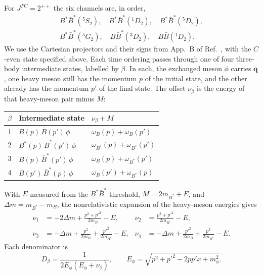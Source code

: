 For $J^{PC}=2^{++}$ the six channels are, in order,
\begin{equation}
\begin{gathered}
 B^*\bar B^*({}^5S_2),\quad B^*\bar B^*({}^1D_2),\quad
 B^*\bar B^*({}^5D_2),\\
 B^*\bar B^*({}^5G_2),\quad B\bar B^*({}^3D_2),\quad
 B\bar B({}^1D_2).
\end{gathered}
\label{eq:channels-2pp}
\end{equation}
We use the Cartesian projectors and their signs from App.~B of
Ref.~\cite{Baru:2019xnh}, with the $C$-even state specified above.
Each time ordering passes through one of four three-body intermediate
states, labelled by $\beta$. In each, the exchanged meson $\phi$ carries
$\bm q$, one heavy meson still has the momentum $p$ of the initial state,
and the other already has the momentum $p'$ of the final state. The
offset $\nu_\beta$ is the energy of that heavy-meson pair minus $M$:
\begin{center}
\begin{tabular}{c@{\qquad}l@{\qquad}l}
\toprule
$\beta$ & Intermediate state & $\nu_\beta+M$\\
\midrule
1 & $B(p)\,\bar B(p')\,\phi$ & $\omega_B(p)+\omega_B(p')$\\
2 & $B^*(p)\,\bar B^*(p')\,\phi$ & $\omega_{B^*}(p)+\omega_{B^*}(p')$\\
3 & $B(p)\,\bar B^*(p')\,\phi$ & $\omega_B(p)+\omega_{B^*}(p')$\\
4 & $B(p')\,\bar B^*(p)\,\phi$ & $\omega_B(p')+\omega_{B^*}(p)$\\
\bottomrule
\end{tabular}
\end{center}
With $E$ measured from the $B^*\bar B^*$ threshold, $M=2m_{B^*}+E$, and
$\Delta m=m_{B^*}-m_B$, the nonrelativistic expansion of the heavy-meson
energies gives
\begin{equation}
\begin{aligned}
 \nu_1&=-2\Delta m+\frac{p^2+p'^2}{2m_B}-E, &
 \nu_2&=\frac{p^2+p'^2}{2m_{B^*}}-E,\\
 \nu_3&=-\Delta m+\frac{p^2}{2m_B}+\frac{p'^2}{2m_{B^*}}-E, &
 \nu_4&=-\Delta m+\frac{p'^2}{2m_B}+\frac{p^2}{2m_{B^*}}-E.
\end{aligned}
\label{eq:offsets-2pp}
\end{equation}
Each denominator is
\begin{equation}
 D_\beta=\frac{1}{2E_\phi(E_\phi+\nu_\beta)},\qquad
 E_\phi=\sqrt{p^2+p'^2-2pp'x+m_\phi^2}.
\end{equation}

